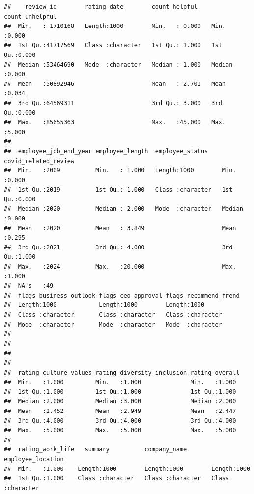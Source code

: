 \documentclass[
]{article}
\begin{document}
\begin{verbatim}
##    review_id        rating_date        count_helpful    count_unhelpful
##  Min.   : 1710168   Length:1000        Min.   : 0.000   Min.   :0.000  
##  1st Qu.:41717569   Class :character   1st Qu.: 1.000   1st Qu.:0.000  
##  Median :53464690   Mode  :character   Median : 1.000   Median :0.000  
##  Mean   :50892946                      Mean   : 2.701   Mean   :0.034  
##  3rd Qu.:64569311                      3rd Qu.: 3.000   3rd Qu.:0.000  
##  Max.   :85655363                      Max.   :45.000   Max.   :5.000  
##                                                                        
##  employee_job_end_year employee_length  employee_status    covid_related_review
##  Min.   :2009          Min.   : 1.000   Length:1000        Min.   :0.000       
##  1st Qu.:2019          1st Qu.: 1.000   Class :character   1st Qu.:0.000       
##  Median :2020          Median : 2.000   Mode  :character   Median :0.000       
##  Mean   :2020          Mean   : 3.849                      Mean   :0.295       
##  3rd Qu.:2021          3rd Qu.: 4.000                      3rd Qu.:1.000       
##  Max.   :2024          Max.   :20.000                      Max.   :1.000       
##  NA's   :49                                                                    
##  flags_business_outlook flags_ceo_approval flags_recommend_frend
##  Length:1000            Length:1000        Length:1000          
##  Class :character       Class :character   Class :character     
##  Mode  :character       Mode  :character   Mode  :character     
##                                                                 
##                                                                 
##                                                                 
##                                                                 
##  rating_culture_values rating_diversity_inclusion rating_overall 
##  Min.   :1.000         Min.   :1.000              Min.   :1.000  
##  1st Qu.:1.000         1st Qu.:1.000              1st Qu.:1.000  
##  Median :2.000         Median :3.000              Median :2.000  
##  Mean   :2.452         Mean   :2.949              Mean   :2.447  
##  3rd Qu.:4.000         3rd Qu.:4.000              3rd Qu.:4.000  
##  Max.   :5.000         Max.   :5.000              Max.   :5.000  
##                                                                  
##  rating_work_life   summary          company_name       employee_location 
##  Min.   :1.000    Length:1000        Length:1000        Length:1000       
##  1st Qu.:1.000    Class :character   Class :character   Class :character  

\end{verbatim}
\end{document}
